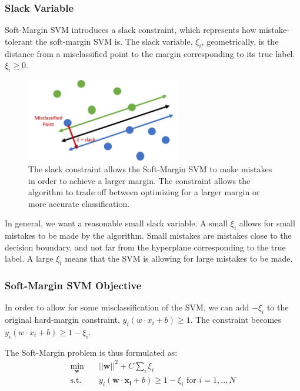 \documentclass[11pt]{article}
\begin{document}
\subsubsection{Slack Variable}

Soft-Margin SVM introduces a slack constraint, which represents how mistake-tolerant the soft-margin SVM is. The slack variable, $ \xi_i$, geometrically, is the distance from a misclassified point to the margin corresponding to its true label. $\xi_i\geq 0$.

\begin{figure}[H]
    \centering
    \includegraphics[width=0.6\textwidth]{images/slack.png}
    \caption{The slack constraint allows the Soft-Margin SVM to make mistakes in order to achieve a larger margin. The constraint allows the algorithm to trade off between optimizing for a larger margin or more accurate classification.}
    \label{fig:my_label}
\end{figure}

In general, we want a reasonable small slack variable. A small $\xi_i$ allows for small mistakes to be made by the algorithm. Small mistakes are mistakes close to the decision boundary, and not far from the hyperplane corresponding to the true label. A large $\xi_i$ means that the SVM is allowing for large mistakes to be made.

\subsubsection{Soft-Margin SVM Objective}
In order to allow for some misclassification of the SVM, we can add $- \xi_i$ to the original hard-margin constraint, $y_i(w \cdot x_i + b) \geq 1$. The constraint becomes $y_i(w \cdot x_i + b) \geq 1 - \xi_i$. 

The Soft-Margin problem is thus formulated as:
\begin{equation}
\begin{aligned}
\min_{\mathbf{w}} \quad & ||\mathbf{w}||^2 + C\sum_i \xi_i \\
\textrm{s.t.} \quad &
 y_i(\mathbf{w} \cdot \mathbf{x_{i}} +b) \geq 1 -\xi_i \text{ for } i = 1, .., N\\
\end{aligned}
\end{equation}
\end{document}
